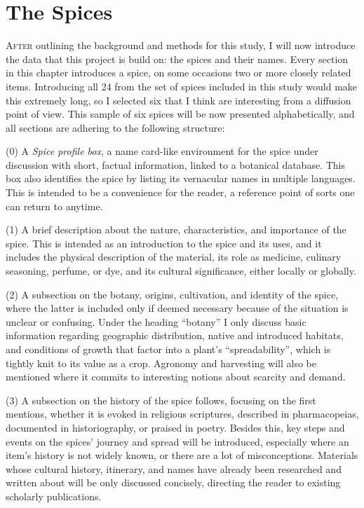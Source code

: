 \chapter{The Spices}
\label{ch:data}

\lettrine[lines=\iniciale,slope=0.5em,findent=-1em]{\textcolor{\accentcolor}{A}}{fter} outlining the background and methods for this study, I will now introduce the data that this project is build on: the spices and their names. Every section in this chapter introduces a spice, on some occasions two or more closely related items. Introducing all 24 from the set of spices included in this study would make this extremely long, so I selected six that I think are interesting from a diffusion point of view. This sample of six spices will be now presented alphabetically, and all sections are adhering to the following structure:

(0) A \textit{Spice profile box}, a name card-like environment for the spice under discussion with short, factual information, linked to a botanical database. This box also identifies the spice by listing its vernacular names in multiple languages. This is intended to be a convenience for the reader, a reference point of sorts one can return to anytime.

(1) A brief description about the nature, characteristics, and importance of the spice. This is intended as an introduction to the spice and its uses, and it includes the physical description of the material, its role as medicine, culinary seasoning, perfume, or dye, and its cultural significance, either locally or globally. 

(2) A subsection on the botany, origins, cultivation, and identity of the spice, where the latter is included only if deemed necessary because of the situation is unclear or confusing. Under the heading ``botany'' I only discuss basic information regarding geographic distribution, native and introduced habitats, and conditions of growth that factor into a plant's ``spreadability'', which is tightly knit to its value as a crop. Agronomy and harvesting will also be mentioned where it commits to interesting notions about scarcity and demand.

(3) A subsection on the history of the spice follows, focusing on the first mentions, whether it is evoked in religious scriptures, described in pharmacopeias, documented in historiography, or praised in poetry. Besides this, key steps and events on the spices' journey and spread will be introduced, especially where an item's history is not widely known, or there are a lot of misconceptions. Materials whose cultural history, itinerary, and names have already been researched and written about will be only discussed concisely, directing the reader to existing scholarly publications. 

